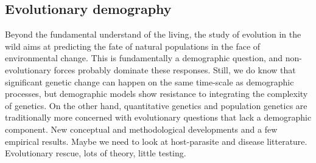 \subsection{Evolutionary demography}
Beyond the fundamental understand of the living, the study of evolution in the wild aims at predicting the fate of natural populations in the face of environmental change. This is fundamentally a demographic question, and non-evolutionary forces probably dominate these responses. Still, we do know that significant genetic change can happen on the same time-scale as demographic processes, but demographic models show resistance to integrating the complexity of genetics. On the other hand, quantitative genetics and population genetics are traditionally more concerned with evolutionary questions that lack a demographic component. 
New conceptual and methodological developments and a few empirical results. Maybe we need to look at host-parasite and disease litterature. 
Evolutionary rescue, lots of theory, little testing. 